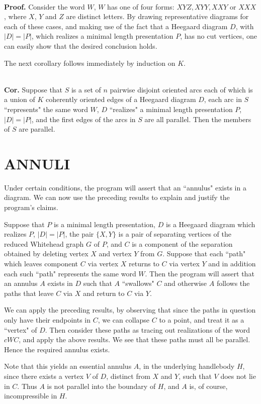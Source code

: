 \documentclass[12pt]{amsart}
\newcommand{\corollary}{\ \\ \noindent \textbf{Cor.} }
\newcommand{\pf}{\ \\ \noindent \textbf{Proof.} }
\begin{document}
        \pf   Consider the word $W$, $W$ has one of four forms: $XYZ, XYY, XXY$ or $XXX$, where
        $X$, $Y$ and $Z$ are distinct letters. By drawing representative diagrams for each of these
        cases, and making use of the fact that a Heegaard diagram $D$, with $|D| = |P|$, which
        realizes a minimal length presentation $P$, has no cut vertices, one can easily show
        that the desired conclusion holds.
        
                The next corollary follows immediately by induction on $K$.
        
        \corollary      Suppose that $S$ is a set of $n$ pairwise disjoint oriented arcs each of which is
        a union of $K$ coherently oriented edges of a Heegaard diagram $D$, each arc in $S$
         ``represents" the same word $W$, $D$  ``realizes" a minimal length presentation $P$, $|D| = |P|$,
        and the first edges of the arcs in $S$ are all parallel. Then the members of $S$ are parallel.   
        
        
                                                                                \section{ANNULI}
                        
                Under certain conditions, the program will assert that an  ``annulus" exists in a
        diagram. We can now use the preceding results to explain and justify the program's
        claims.
        
                Suppose that $P$ is a minimal length presentation, $D$ is a Heegaard diagram which
        realizes $P$, $|D| = |P|$, the pair $\{ X, Y\}$ is a pair of separating vertices of the reduced
        Whitehead graph $G$ of $P$, and $C$ is a component of the separation obtained by deleting
        vertex $X$ and vertex $Y$ from $G$. Suppose that each  ``path" which leaves component $C$ via
        vertex $X$ returns to $C$ via vertex $Y$ and in addition each such  ``path" represents the same
        word $W$. Then the program will assert that an annulus $A$ exists in $D$ such that $A$  ``swallows"
        $C$ and otherwise $A$ follows the paths that leave $C$ via $X$ and return to $C$ via $Y$.
        
                We can apply the preceding results, by observing that since the paths in question
        only have their endpoints in $C$, we can collapse $C$ to a point, and treat it as a
         ``vertex" of $D$.        Then consider these paths as tracing out realizations of the word $cWC$,
        and apply the above results. We see that these paths must all be parallel. Hence the
        required annulus exists.
        
                Note that this yields an essential annulus $A$, in the underlying handlebody $H$, since
        there exists a vertex $V$ of $D$, distinct from $X$ and $Y$, such that $V$ does not lie in $C$.
        Thus $A$ is not parallel into the boundary of $H$, and $A$ is, of course, incompressible in $H$.
        

        
\end{document}
